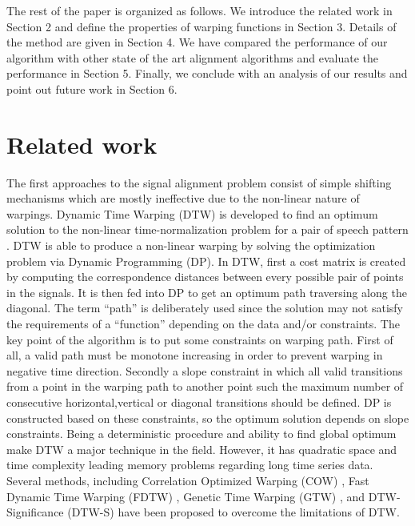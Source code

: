 \documentclass[number,1p,12pt]{elsarticle}
\begin{document}
The rest of the paper is organized as follows. We introduce the related work in Section 2 and define the properties of warping functions in Section 3. Details of the method are given in Section 4. We have compared the performance of our algorithm with other state of the art alignment algorithms and evaluate the performance in Section 5. Finally, we conclude with an analysis of our results and point out future work in Section 6.

\section{Related work}
The first approaches to the signal alignment problem consist of simple shifting mechanisms which are mostly ineffective due to the non-linear nature of warpings. Dynamic Time Warping (DTW) is developed to find an optimum solution to the non-linear time-normalization problem for a pair of speech pattern \cite{Sakoe1978}. DTW is able to produce a non-linear warping by solving the optimization problem via Dynamic Programming (DP). In DTW, first a cost matrix is created by computing the correspondence distances between every possible pair of points in the signals. It is then fed into DP to get an optimum path traversing along the diagonal. The term ``path'' is deliberately used since the solution may not satisfy the requirements of a ``function'' depending on the data and/or constraints. The key point of the algorithm is to put some constraints on warping path. First of all, a valid path must be monotone increasing in order to prevent warping in negative time direction. Secondly a slope constraint in which all valid transitions from a point in the warping path to another point such the maximum number of consecutive horizontal,vertical or diagonal transitions should be defined. DP is constructed based on these constraints, so the optimum solution depends on slope constraints. Being a deterministic procedure and ability to find global optimum make DTW a major technique in the field. However, it has quadratic space and time complexity leading memory problems regarding long time series data. Several methods, including Correlation Optimized Warping (COW) \cite{Nielsen1998}, Fast Dynamic Time Warping (FDTW) \cite{Salvadora2007}, Genetic Time Warping (GTW) \cite{Kwong1996}, and DTW-Significance (DTW-S) \cite{Yuan2011} have been proposed to overcome the limitations of DTW.
\end{document}
